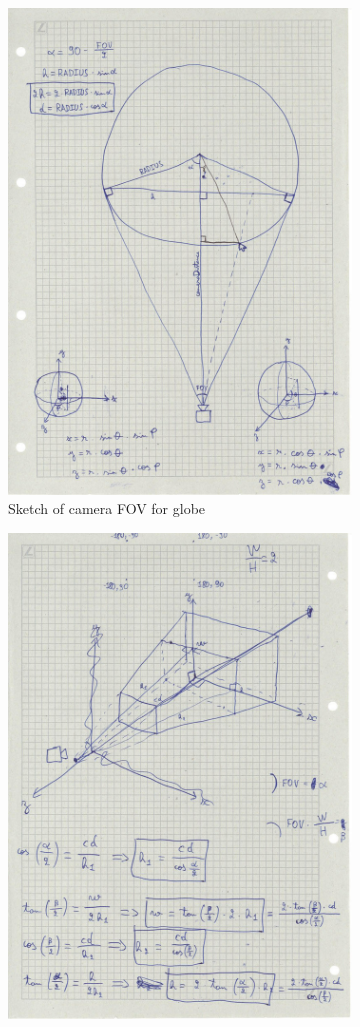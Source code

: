\documentclass[10pt,conference,compsocconf]{IEEEtran}
\begin{document}
\begin{figure}
\centering
\begin{subfigure}{.45\textwidth}
  \centering
  \includegraphics[width=.8\linewidth]{images/scratch-paper-raja-1}
  \caption{Sketch of camera FOV for globe}
  \label{fig:timeline_sketch}
\end{subfigure}%
\begin{subfigure}{.45\textwidth}
  \centering
  \includegraphics[width=.8\linewidth]{images/scratch-paper-raja-2}

\end{subfigure}
\end{figure}
\end{document}
